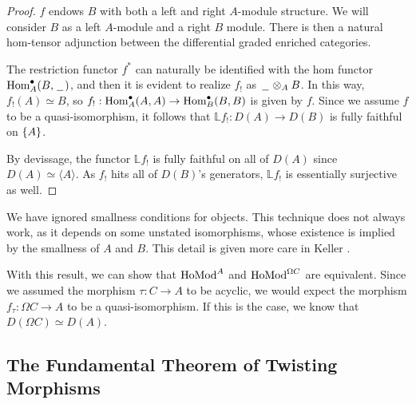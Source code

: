 \documentclass[../thesis.tex]{subfiles}
\begin{document}
            \begin{proof}
                $f$ endows $B$ with both a left and right $A$-module structure. We will consider $B$ as a left $A$-module and a right $B$ module. There is then a natural hom-tensor adjunction between the differential graded enriched categories.

                \begin{center}
                \end{center}

                The restriction functor $f^*$ can naturally be identified with the hom functor $\tt{Hom}_A^\bullet(B,\argument)$, and then it is evident to realize $f_!$ as $\argument \otimes_A B$. In this way, $f_!(A) \simeq B$, so $f_! : \tt{Hom}_A^\bullet (A,A) \rightarrow \tt{Hom}_B^\bullet (B,B)$ is given by $f$. Since we assume $f$ to be a quasi-isomorphism, it follows that $\mathbb{L}f_! : D(A) \rightarrow D(B)$ is fully faithful on $\startset{A}$.

                By devissage, the functor $\mathbb{L}f_!$ is fully faithful on all of $D(A)$ since $D(A) \simeq \langle A \rangle$. As $f_!$ hits all of $D(B)$'s generators, $\mathbb{L}f_!$ is essentially surjective as well.
            \end{proof}

            \begin{remark}
                We have ignored smallness conditions for objects. This technique does not always work, as it depends on some unstated isomorphisms, whose existence is implied by the smallness of $A$ and $B$. This detail is given more care in Keller \cite{Keller94}.
            \end{remark}
                
            With this result, we can show that $\tt{Ho} \tt{Mod}^A$ and $\tt{Ho} \tt{Mod}^{\Omega C}$ are equivalent. Since we assumed the morphism $\tau: C \rightarrow A$ to be acyclic, we would expect the morphism $f_\tau: \Omega C \rightarrow A$ to be a quasi-isomorphism. If this is the case, we know that $D(\Omega C)\simeq D(A)$. 

        \subsection{The Fundamental Theorem of Twisting Morphisms}
\end{document}
